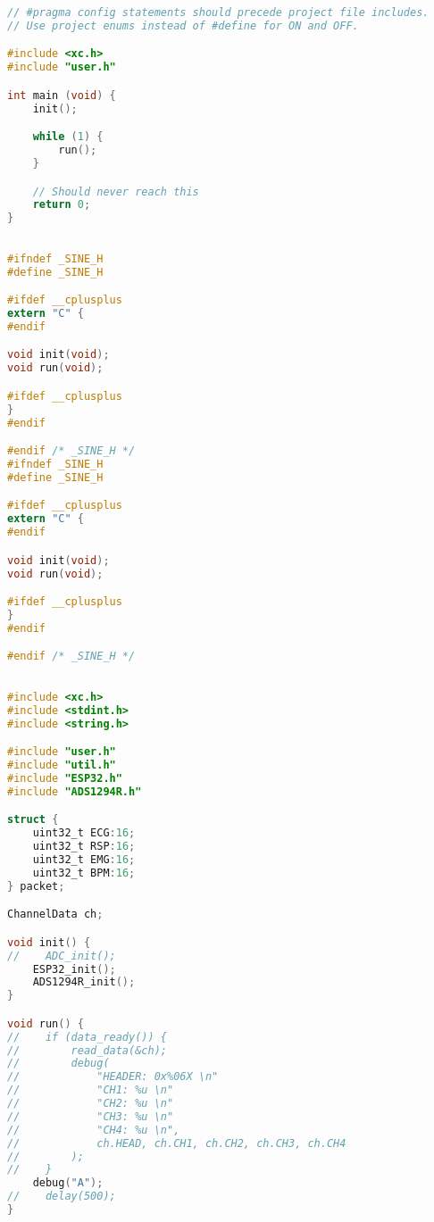 \begin{lstlisting}[language=C]
// #pragma config statements should precede project file includes.
// Use project enums instead of #define for ON and OFF.

#include <xc.h>
#include "user.h"

int main (void) {
    init();

    while (1) {
        run();
    }

    // Should never reach this
    return 0;
}

\end{lstlisting}


\begin{lstlisting}[language=C]

#ifndef _SINE_H
#define _SINE_H

#ifdef __cplusplus
extern "C" {
#endif

void init(void);
void run(void);

#ifdef __cplusplus
}
#endif

#endif /* _SINE_H */
#ifndef _SINE_H
#define _SINE_H

#ifdef __cplusplus
extern "C" {
#endif

void init(void);
void run(void);

#ifdef __cplusplus
}
#endif

#endif /* _SINE_H */

\end{lstlisting}

\begin{lstlisting}[language=C]

#include <xc.h>
#include <stdint.h>
#include <string.h>

#include "user.h"
#include "util.h"
#include "ESP32.h"
#include "ADS1294R.h"

struct {
    uint32_t ECG:16;
    uint32_t RSP:16;
    uint32_t EMG:16;
    uint32_t BPM:16;
} packet;

ChannelData ch;

void init() {
//    ADC_init();
    ESP32_init();
    ADS1294R_init();
}

void run() {
//    if (data_ready()) {
//        read_data(&ch);
//        debug(
//            "HEADER: 0x%06X \n"
//            "CH1: %u \n"
//            "CH2: %u \n"
//            "CH3: %u \n"
//            "CH4: %u \n",
//            ch.HEAD, ch.CH1, ch.CH2, ch.CH3, ch.CH4
//        );
//    }
    debug("A");
//    delay(500);
}
\end{lstlisting}

